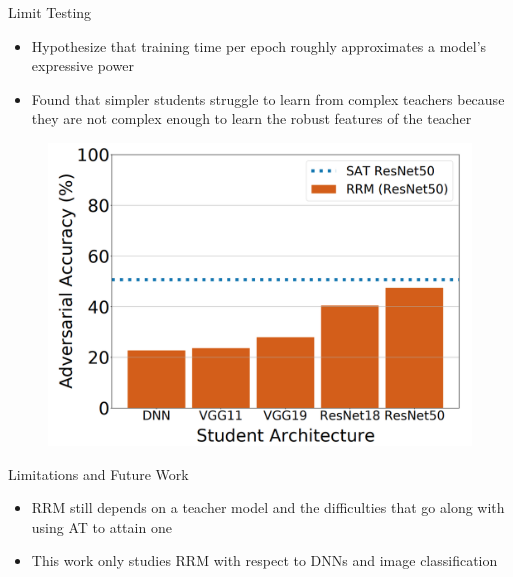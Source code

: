 \documentclass{beamer}
\begin{document}
\begin{frame}{Limit Testing}
	
	\begin{itemize}
		\item Hypothesize that training time per epoch roughly approximates a model's expressive power
		\item Found that simpler students struggle to learn from complex teachers because they are not complex enough to learn the robust features of the teacher
	\end{itemize}

	\begin{figure}
		\centering
		\includegraphics[scale=.40]{./images/limit_testing.png}
		\caption{}
	\end{figure}
	
\end{frame}



\begin{frame}{Limitations and Future Work}
	
	\begin{itemize}
		\item RRM still depends on a teacher model and the difficulties that go along with using AT to attain one
		\item This work only studies RRM with respect to DNNs and image classification
	\end{itemize}
	
\end{frame}
\end{document}
